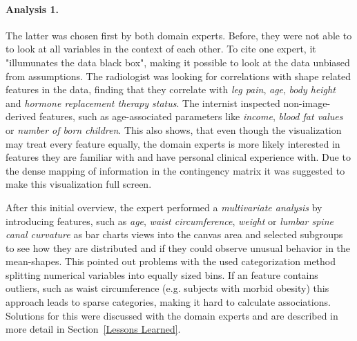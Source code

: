 \documentclass[journal]{style/vgtc} 			          %
\newcommand{\com}[1]{\textcolor{orange}{\uline{#1}}}
\begin{document}
\paragraph{Analysis 1.}
%
The latter was chosen first by both domain experts.
%
Before, they were not able to to look at all variables in the context of each other.
%
%
To cite one expert, it "illumunates the data black box", making it possible to look at the data unbiased from assumptions.
%
The radiologist was looking for correlations with shape related features in the data, finding that they correlate with \emph{leg pain}, \emph{age}, \emph{body height} and \emph{hormone replacement therapy status}.
%
The internist inspected non-image-derived features, such as age-associated parameters like \emph{income}, \emph{blood fat values} or \emph{number of born children}.
%
This also shows, that even though the visualization may treat every feature equally, the domain experts is more likely interested in features they are familiar with and have personal clinical experience with.
%
Due to the dense mapping of information in the contingency matrix it was suggested to make this visualization full screen.

After this initial overview, the expert performed a \emph{multivariate analysis} by introducing features, such as \emph{age}, \emph{waist circumference}, \emph{weight} or \emph{lumbar spine canal curvature} as bar charts views into the canvas area and selected subgroups to see how they are distributed and if they could observe unusual behavior in the mean-shapes.
%
This pointed out problems with the used categorization method splitting numerical variables into equally sized bins.
%
If an feature contains outliers, such as waist circumference (e.g. subjects with morbid obesity) this approach leads to sparse categories, making it hard to calculate associations.
%
Solutions for this were discussed with the domain experts and are described in more detail in Section~\ref{Lessons Learned}.
%
%
\end{document}
